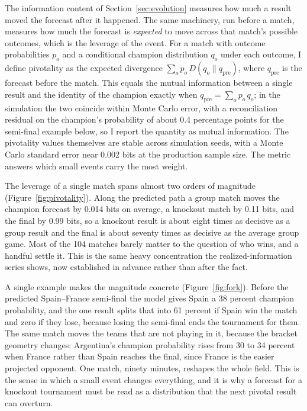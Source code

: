 \documentclass[11pt,letterpaper]{article}
\begin{document}
The information content of Section~\ref{sec:evolution} measures how much a result moved the forecast after it happened. The same machinery, run before a match, measures how much the forecast is \emph{expected} to move across that match's possible outcomes, which is the leverage of the event. For a match with outcome probabilities $p_o$ and a conditional champion distribution $q_o$ under each outcome, I define pivotality as the expected divergence $\sum_o p_o\, D(q_o \parallel q_{\text{pre}})$, where $q_{\text{pre}}$ is the forecast before the match. This equals the mutual information between a single result and the identity of the champion exactly when $q_{\text{pre}} = \sum_o p_o\, q_o$; in the simulation the two coincide within Monte Carlo error, with a reconciliation residual on the champion's probability of about 0.4 percentage points for the semi-final example below, so I report the quantity as mutual information. The pivotality values themselves are stable across simulation seeds, with a Monte Carlo standard error near 0.002 bits at the production sample size. The metric answers which small events carry the most weight.

The leverage of a single match spans almost two orders of magnitude (Figure~\ref{fig:pivotality}). Along the predicted path a group match moves the champion forecast by 0.014 bits on average, a knockout match by 0.11 bits, and the final by 0.99 bits, so a knockout result is about eight times as decisive as a group result and the final is about seventy times as decisive as the average group game. Most of the 104 matches barely matter to the question of who wins, and a handful settle it. This is the same heavy concentration the realized-information series shows, now established in advance rather than after the fact.

A single example makes the magnitude concrete (Figure~\ref{fig:fork}). Before the predicted Spain--France semi-final the model gives Spain a 38 percent champion probability, and the one result splits that into 61 percent if Spain win the match and zero if they lose, because losing the semi-final ends the tournament for them. The same match moves the teams that are not playing in it, because the bracket geometry changes: Argentina's champion probability rises from 30 to 34 percent when France rather than Spain reaches the final, since France is the easier projected opponent. One match, ninety minutes, reshapes the whole field. This is the sense in which a small event changes everything, and it is why a forecast for a knockout tournament must be read as a distribution that the next pivotal result can overturn.
\end{document}
